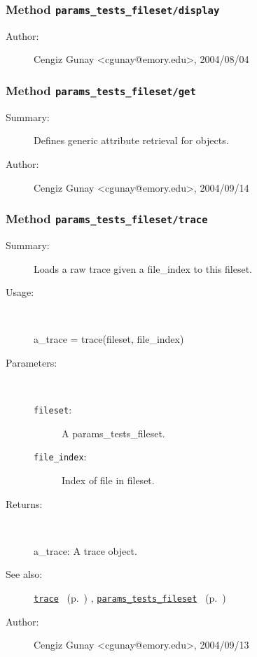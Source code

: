 \subsubsection[Method \texttt{display}]{Method \texttt{params\_tests\_fileset/display}}%
%
\label{ref_params_tests_fileset__display}%
\hypertarget{ref_params_tests_fileset__display}{}%
\begin{description}
%
%
%
%
%
%
%
\item[Author:]%
Cengiz Gunay <cgunay@emory.edu>, 2004/08/04%
\end{description}
\methodline%
\subsubsection[Method \texttt{get}]{Method \texttt{params\_tests\_fileset/get}}%
%
\label{ref_params_tests_fileset__get}%
\hypertarget{ref_params_tests_fileset__get}{}%
\begin{description}
\item[Summary:]Defines generic attribute retrieval for objects.
%
%
%
%
%
%
%
\item[Author:]%
Cengiz Gunay <cgunay@emory.edu>, 2004/09/14%
\end{description}
\methodline%
\subsubsection[Method \texttt{trace}]{Method \texttt{params\_tests\_fileset/trace}}%
%
\label{ref_params_tests_fileset__trace}%
\hypertarget{ref_params_tests_fileset__trace}{}%
\begin{description}
\item[Summary:]Loads a raw trace given a file\_index to this fileset.
%
\item[Usage:]~%
\begin{lyxcode}%
a\_trace = trace(fileset, file\_index)
%
\end{lyxcode}%
%
%
\item[Parameters:]~
\begin{description}%
\item[\texttt{fileset}:]
 A params\_tests\_fileset.
\item[\texttt{file\_index}:]
 Index of file in fileset.
\end{description}%
%
\item[Returns:]~

	a\_trace: A trace object.
%
%
\item[See also:]%
\hyperlink{ref_trace}{\texttt{trace}}%
\ (p.~\pageref{ref_trace})%
%
, \hyperlink{ref_params_tests_fileset}{\texttt{params\_tests\_fileset}}%
\ (p.~\pageref{ref_params_tests_fileset})%
%
%
\item[Author:]%
Cengiz Gunay <cgunay@emory.edu>, 2004/09/13%
\end{description}
\methodline%
